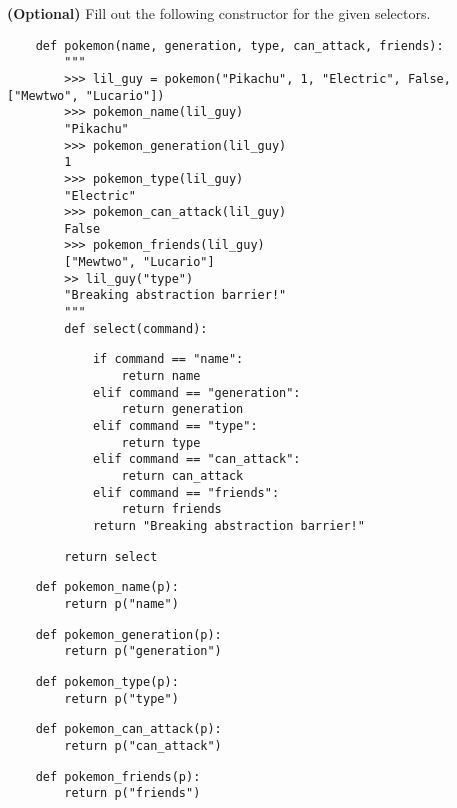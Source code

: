     \begin{blocksection}
    \question \textbf{(Optional)} Fill out the following constructor for the given
    selectors.
    
    \begin{lstlisting}
    def pokemon(name, generation, type, can_attack, friends):
        """
        >>> lil_guy = pokemon("Pikachu", 1, "Electric", False, ["Mewtwo", "Lucario"])
        >>> pokemon_name(lil_guy)
        "Pikachu"
        >>> pokemon_generation(lil_guy)
        1
        >>> pokemon_type(lil_guy)
        "Electric"
        >>> pokemon_can_attack(lil_guy)
        False
        >>> pokemon_friends(lil_guy)
        ["Mewtwo", "Lucario"]
        >> lil_guy("type")
        "Breaking abstraction barrier!"
        """
        def select(command):
    \end{lstlisting}
    \begin{solution}[1.8in]
    \begin{lstlisting}
            if command == "name":
                return name
            elif command == "generation":
                return generation
            elif command == "type":
                return type
            elif command == "can_attack":
                return can_attack
            elif command == "friends":
                return friends
            return "Breaking abstraction barrier!"
    \end{lstlisting}
    \end{solution}
    
    \begin{lstlisting}
        return select
    \end{lstlisting}
    
    \begin{lstlisting}
    def pokemon_name(p):
        return p("name")
    \end{lstlisting}
    
    \begin{lstlisting}
    def pokemon_generation(p):
        return p("generation")
    \end{lstlisting}
    
    \begin{lstlisting}
    def pokemon_type(p):
        return p("type")
    \end{lstlisting}

    \begin{lstlisting}
    def pokemon_can_attack(p):
        return p("can_attack")
    \end{lstlisting}

    \begin{lstlisting}
    def pokemon_friends(p):
        return p("friends")
    \end{lstlisting}
    
    \end{blocksection}
    